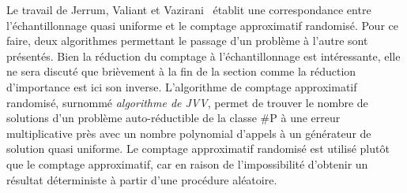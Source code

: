 Le travail de Jerrum, Valiant et Vazirani~\cite{jerrumRandomGenerationCombinatorial1986} établit une correspondance entre l'échantillonnage quasi uniforme et le comptage approximatif randomisé. Pour ce faire, deux algorithmes permettant le passage d'un problème à l'autre sont présentés. Bien la réduction du comptage à l'échantillonnage est intéressante, elle ne sera discuté que brièvement à la fin de la section comme la réduction d'importance est ici son inverse. L'algorithme de comptage approximatif randomisé, surnommé \textit{algorithme de JVV}, permet de trouver le nombre de solutions d'un problème auto-réductible de la classe \textsf{\#P} à une erreur multiplicative près avec un nombre polynomial d'appels à un générateur de solution quasi uniforme. Le comptage approximatif randomisé est utilisé plutôt que le comptage approximatif, car en raison de l'impossibilité d'obtenir un résultat déterministe à partir d'une procédure aléatoire.


